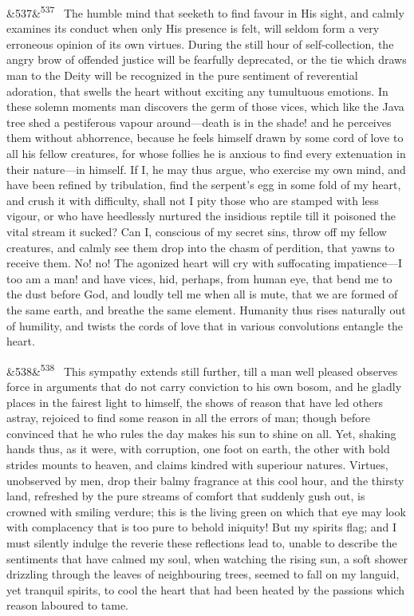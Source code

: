 \documentclass[12pt]{article}
\newcommand{\para}[1][]{\par\noindent\ifx&#1&\else\textsuperscript{\footnotesize #1}~\fi}
\begin{document}
\para[537] The humble mind that seeketh to find favour in His sight, and calmly examines its conduct when only His presence is felt, will seldom form a very erroneous opinion of its own virtues. During the still hour of self-collection, the angry brow of offended justice will be fearfully deprecated, or the tie which draws man to the Deity will be recognized in the pure sentiment of reverential adoration, that swells the heart without exciting any tumultuous emotions. In these solemn moments man discovers the germ of those vices, which like the Java tree shed a pestiferous vapour around---death is in the shade! and he perceives them without abhorrence, because he feels himself drawn by some cord of love to all his fellow creatures, for whose follies he is anxious to find every extenuation in their nature---in himself. If I, he may thus argue, who exercise my own mind, and have been refined by tribulation, find the serpent's egg in some fold of my heart, and crush it with difficulty, shall not I pity those who are stamped with less vigour, or who have heedlessly nurtured the insidious reptile till it poisoned the vital stream it sucked? Can I, conscious of my secret sins, throw off my fellow creatures, and calmly see them drop into the chasm of perdition, that yawns to receive them. No! no! The agonized heart will cry with suffocating impatience---I too am a man! and have vices, hid, perhaps, from human eye, that bend me to the dust before God, and loudly tell me when all is mute, that we are formed of the same earth, and breathe the same element. Humanity thus rises naturally out of humility, and twists the cords of love that in various convolutions entangle the heart.

\para[538] This sympathy extends still further, till a man well pleased observes force in arguments that do not carry conviction to his own bosom, and he gladly places in the fairest light to himself, the shows of reason that have led others astray, rejoiced to find some reason in all the errors of man; though before convinced that he who rules the day makes his sun to shine on all. Yet, shaking hands thus, as it were, with corruption, one foot on earth, the other with bold strides mounts to heaven, and claims kindred with superiour natures. Virtues, unobserved by men, drop their balmy fragrance at this cool hour, and the thirsty land, refreshed by the pure streams of comfort that suddenly gush out, is crowned with smiling verdure; this is the living green on which that eye may look with complacency that is too pure to behold iniquity! But my spirits flag; and I must silently indulge the reverie these reflections lead to, unable to describe the sentiments that have calmed my soul, when watching the rising sun, a soft shower drizzling through the leaves of neighbouring trees, seemed to fall on my languid, yet tranquil spirits, to cool the heart that had been heated by the passions which reason laboured to tame.
\end{document}
